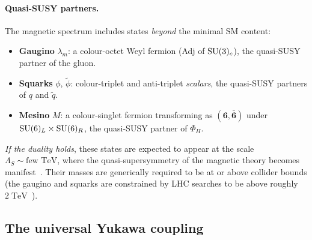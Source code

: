 \documentclass[11pt,a4paper]{article}
\begin{document}
\paragraph{Quasi-SUSY partners.}
The magnetic spectrum includes states \emph{beyond} the minimal SM
content:
\begin{itemize}
  \item \textbf{Gaugino} $\lambda_m$: a colour-octet Weyl fermion
    (Adj of $\mathrm{SU}(3)_c$), the quasi-SUSY partner of the gluon.
  \item \textbf{Squarks} $\phi$, $\widetilde{\phi}$: colour-triplet
    and anti-triplet \emph{scalars}, the quasi-SUSY partners of
    $q$ and $\widetilde{q}$.
  \item \textbf{Mesino} $M$: a colour-singlet fermion transforming as
    $(\mathbf{6}, \bar{\mathbf{6}})$ under $\mathrm{SU}(6)_L \times \mathrm{SU}(6)_R$,
    the quasi-SUSY partner of $\Phi_H$.
\end{itemize}
\emph{If the duality holds}, these states are expected to appear at the
scale $\Lambda_S \sim \text{few TeV}$, where the quasi-supersymmetry
of the magnetic theory becomes
manifest~\cite{CacciapagliaSannino2024}.  Their masses are
generically required to be at or above collider bounds (the gaugino
and squarks are constrained by LHC searches to be above roughly
$2\;\text{TeV}$~\cite{CacciapagliaSannino2024}).

\subsection{The universal Yukawa coupling}
\end{document}
